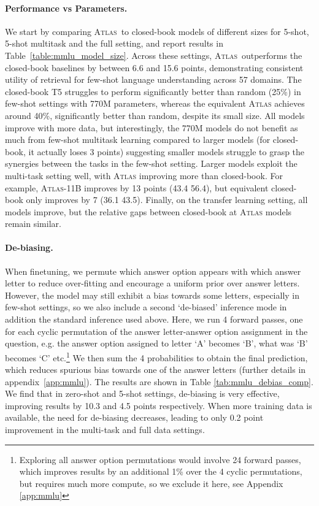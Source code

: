 \documentclass[10pt]{article} \usepackage[preprint]{tmlr}
\newcommand{\Atlas}{\textsc{Atlas}}
\begin{document}
\paragraph{Performance vs Parameters.} We start by comparing \Atlas~to closed-book models of different sizes for 5-shot, 5-shot multitask and the full setting, and report results in Table~\ref{table:mmlu_model_size}.
Across these settings, \Atlas~outperforms the closed-book baselines by between 6.6 and 15.6 points, demonstrating consistent utility of retrieval for few-shot language understanding across 57 domains.
The closed-book T5 struggles to perform significantly better than random (25\%) in  few-shot settings with 770M parameters, whereas the equivalent \Atlas{} achieves around 40\%, significantly better than random, despite its small size.
All models improve with more data, but interestingly, the 770M models do not benefit as much from few-shot multitask learning compared to larger models (for closed-book, it actually loses 3 points) suggesting smaller models struggle to grasp the synergies between the tasks in the few-shot setting.
Larger models exploit the multi-task setting well, with \Atlas{} improving more than closed-book. For example, \Atlas{}-11B improves by 13 points  (43.4  56.4), but equivalent closed-book only improves by 7 (36.1  43.5).
Finally, on the transfer learning setting, all models improve, but the relative gaps between closed-book at \Atlas{} models remain similar.


\paragraph{De-biasing.} 
When finetuning, we permute which answer option appears with which answer letter to reduce over-fitting and encourage a uniform prior over answer letters. 
However, the model may still exhibit a bias towards some letters, especially in few-shot settings, so we also include a second `de-biased' inference mode in addition the standard inference used above. Here, we run 4 forward passes, one for each cyclic permutation of the answer letter-answer option assignment in the question, e.g. the answer option assigned to letter `A'  becomes `B', what was `B' becomes `C' etc.\footnote{Exploring all answer option permutations would involve 24 forward passes, which improves results by an additional 1\% over the 4 cyclic permutations, but requires much more compute, so we exclude it here, see Appendix \ref{app:mmlu}}
We then sum the 4 probabilities to obtain the final prediction, which reduces spurious bias towards one of the answer letters (further details in appendix~\ref{app:mmlu}). The results are shown in Table \ref{tab:mmlu_debias_comp}. We find that in zero-shot and 5-shot settings, de-biasing is very effective, improving results by 10.3 and 4.5 points respectively. When more training data is available, the need for de-biasing decreases, leading to only 0.2 point improvement in the multi-task and full data settings.
\end{document}
